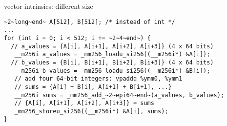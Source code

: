 \begin{frame}[fragile,label=intrSizes]{vector intrinsics: different size}
\begin{lstlisting}
~2~long~end~ A[512], B[512]; /* instead of int */
...
for (int i = 0; i < 512; i += ~2~4~end~) {
  // a_values = {A[i], A[i+1], A[i+2], A[i+3]} (4 x 64 bits)
   __m256i a_values = _mm256_loadu_si256((__m256i*) &A[i]);
  // b_values = {B[i], B[i+1], B[i+2], B[i+3]} (4 x 64 bits)
   __m256i b_values = _mm256_loadu_si256((__m256i*) &B[i]);
   // add four 64-bit integers: vpaddq %ymm0, %ymm1
   // sums = {A[i] + B[i], A[i+1] + B[i+1], ...}
   __m256i sums = _mm256_add_~2~epi64~end~(a_values, b_values);
   // {A[i], A[i+1], A[i+2], A[i+3]} = sums
   _mm256_storeu_si256((__m256i*) &A[i], sums);
}
\end{lstlisting}
\end{frame}
